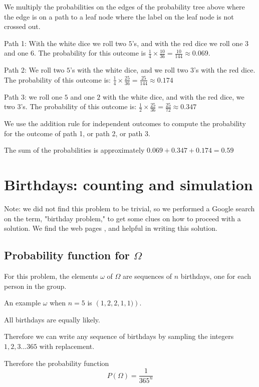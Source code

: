 \documentclass[a4paper,11pt]{article}
\begin{document}
We multiply the probabilities on the edges of the probability tree above
where the edge is on a path to a leaf node where the label on
the leaf node is not crossed out.

Path 1: With the white dice we roll two $5$'s, and with the red dice
we roll one $3$ and one $6$.  The probability for this outcome is
$\frac{1}{4} \times \frac{10}{36} = \frac{10}{144} \approx 0.069$.

Path 2: We roll two $5$'s with the white dice, and we roll two $3$'s
with the red dice.  The probability of this outcome is:
$\frac{1}{4} \times \frac{25}{36} = \frac{25}{144} \approx 0.174$

Path 3: we roll one $5$ and one $2$ with the white dice,
and with the red dice, we two $3$'s.  The probability of this outcome 
is: $\frac{1}{2} \times \frac{25}{36} = \frac{25}{72} \approx 0.347$

We use the addition rule for independent outcomes to compute the
probability for the outcome of path 1, or path 2, or path 3.

The sum of the probabilities is approximately 
$0.069 + 0.347 + 0.174 = 0.59$

\section{Birthdays: counting and simulation}
Note: we did not find this problem to be trivial, so we performed a
Google search on the term, "birthday problem," to get some clues
on how to proceed with a solution.  We find the web pages
\cite{birthProbWiki}, and \cite{betterExpBirth} helpful in writing
this solution.


\subsection{Probability function for $\Omega$}
For this problem, the elements $\omega$ of $\Omega$ are sequences of $n$
birthdays, one for each person in the group.  

An example $\omega$ when $n=5$ is $\left( 1, 2, 2, 1, 1) \right)$.

All birthdays are equally likely.

Therefore we can write any sequence of birthdays by sampling the
integers ${1,2,3...365}$ with replacement.


Therefore the probability function
\begin{equation}
P\left ( \Omega \right) = \frac{1}{365^{n}}
\end{equation} 
\end{document}
